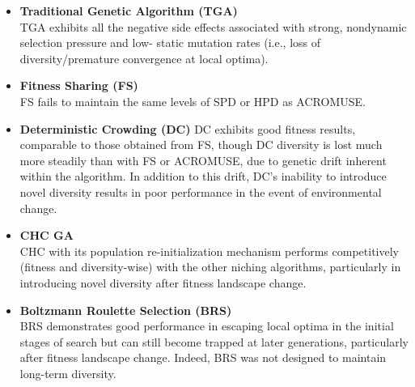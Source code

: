 \documentclass[../main.tex]{subfiles}
\begin{document}
\begin{itemize}

	\item \textbf{Traditional Genetic Algorithm (TGA)} \\
	TGA exhibits all the negative side effects associated with strong, nondynamic selection pressure and low- static
	mutation rates (i.e., loss of diversity/premature convergence at local optima).

	\item \textbf{Fitness Sharing (FS)} \\
	FS fails to maintain the same levels of SPD or HPD as ACROMUSE.

	\item \textbf{Deterministic Crowding (DC)}
	DC exhibits good fitness results, comparable to those obtained from FS, though DC diversity is lost much more
	steadily than with FS or ACROMUSE, due to genetic drift inherent within the algorithm. In addition to this drift,
	DC’s inability to introduce novel diversity results in poor performance in the event of environmental change.

	\item \textbf{CHC GA} \\
	CHC with its population re-initialization mechanism performs competitively (fitness and diversity-wise) with the
	other niching algorithms, particularly in introducing novel diversity after fitness landscape change.

	\item \textbf{Boltzmann Roulette Selection (BRS)} \\
	BRS demonstrates good performance in escaping local optima in the initial stages of search but can still become
	trapped at later generations, particularly after fitness landscape change. Indeed, BRS was not designed to maintain
	long-term diversity.

\end{itemize}
\end{document}
